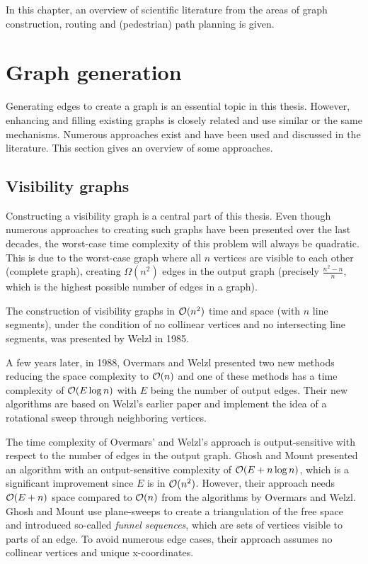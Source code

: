 
In this chapter, an overview of scientific literature from the areas of graph construction, routing and (pedestrian) path planning is given.

\section{Graph generation}
\label{sec:graph-generation}

	Generating edges to create a graph is an essential topic in this thesis.
	However, enhancing and filling existing graphs is closely related and use similar or the same mechanisms.
	Numerous approaches exist and have been used and discussed in the literature.
	This section gives an overview of some approaches.

	\subsection{Visibility graphs}
	\label{subsec:related-work:visibility-graph}

		Constructing a visibility graph is a central part of this thesis.
		Even though numerous approaches to creating such graphs have been presented over the last decades, the worst-case time complexity of this problem will always be quadratic.
		This is due to the worst-case graph where all $n$ vertices are visible to each other (complete graph), creating $\Omega(n^2)$ edges in the output graph (precisely $\frac{n^2-n}{n}$, which is the highest possible number of edges in a graph).
		
		The construction of visibility graphs in $\mathcal{O}(n^2)$ time and space (with $n$ line segments), under the condition of no collinear vertices and no intersecting line segments, was presented by Welzl in 1985\cite{welzl-visibility-graph}.
		
		A few years later, in 1988, Overmars and Welzl presented two new methods reducing the space complexity to $\mathcal{O}(n)$\cite{overmars-weizl-visibility-graph} and one of these methods has a time complexity of $\mathcal{O}(E \log n)$ with $E$ being the number of output edges.
		Their new algorithms are based on Welzl's earlier paper and implement the idea of a rotational sweep through neighboring vertices.
		
		The time complexity of Overmars' and Welzl's approach is output-sensitive with respect to the number of edges in the output graph\cite{ghosh-output-sensitive-vgraph}.
		Ghosh and Mount presented an algorithm with an output-sensitive complexity of $\mathcal{O}(E + n \log n)$, which is a significant improvement since $E$ is in $\mathcal{O}(n^2)$.
		However, their approach needs $\mathcal{O}(E + n)$ space compared to $\mathcal{O}(n)$ from the algorithms by Overmars and Welzl.
		Ghosh and Mount use plane-sweeps to create a triangulation of the free space and introduced so-called \emph{funnel sequences}, which are sets of vertices visible to parts of an edge.
		To avoid numerous edge cases, their approach assumes no collinear vertices and unique x-coordinates.
		
